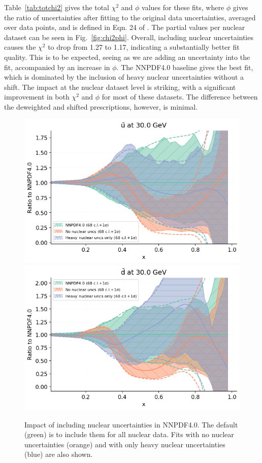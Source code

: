 Table~\ref{tab:totchi2} gives the total $\chi^2$ and $\phi$ values for these fits, where $\phi$ gives the ratio of uncertainties after fitting to the original data uncertainties, averaged over data points, and is defined in Eqn. 24 of \cite{Ball:2014uwa}. The partial values per nuclear dataset can be seen in Fig.~\ref{fig:chi2phi}. Overall, including nuclear uncertainties causes the $\chi^2$ to drop from 1.27 to 1.17, indicating a substantially better fit quality. This is to be expected, seeing as we are adding an uncertainty into the fit, accompanied by an increase in $\phi$. The NNPDF4.0 baseline gives the best fit, which is dominated by the inclusion of heavy nuclear uncertainties without a shift. The impact at the nuclear dataset level is striking, with a significant improvement in both $\chi^2$ and $\phi$ for most of these datasets. The difference between the deweighted and shifted prescriptions, however, is minimal.
\begin{figure}[H]
  \begin{center}
      \includegraphics[width=0.49\linewidth]{nuclear/plots/ubar1.png}
     \includegraphics[width=0.49\linewidth]{nuclear/plots/dbar1.png}
    \caption{Impact of including nuclear uncertainties in NNPDF4.0. The default (green) is to include them for all nuclear data. Fits with no nuclear uncertainties (orange) and with only heavy nuclear uncertainties (blue) are also shown.
    \label{fig:pdfs1} }
    \end{center}
\end{figure}   

